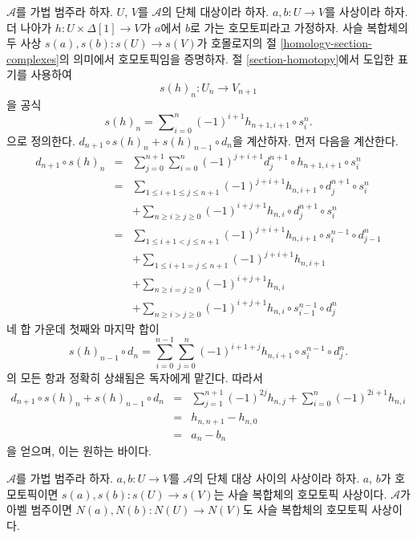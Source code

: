 \noindent
$\mathcal{A}$를 가법 범주라 하자. $U$, $V$를 $\mathcal{A}$의 단체
대상이라 하자. $a, b : U \to V$를 사상이라 하자. 더 나아가
$h : U \times \Delta[1] \to V$가 $a$에서 $b$로 가는 호모토피라고
가정하자. 사슬 복합체의 두 사상
$s(a), s(b) : s(U) \longrightarrow s(V)$가 호몰로지의 절
\ref{homology-section-complexes}의 의미에서 호모토픽임을 증명하자.
절 \ref{section-homotopy}에서 도입한 표기를 사용하여
$$
s(h)_n : U_n \longrightarrow V_{n + 1}
$$
을 공식
\begin{equation}
\label{equation-homotopy-to-homotopy}
s(h)_n = \sum\nolimits_{i = 0}^n (-1)^{i + 1} h_{n + 1, i + 1} \circ s^n_i.
\end{equation}
으로 정의한다.
$d_{n + 1} \circ s(h)_n + s(h)_{n - 1} \circ d_n$을 계산하자.
먼저 다음을 계산한다.
\begin{eqnarray*}
d_{n + 1} \circ s(h)_n & = &
\sum\nolimits_{j = 0}^{n + 1}
\sum\nolimits_{i = 0}^n
(-1)^{j + i + 1}
d^{n + 1}_j \circ h_{n + 1, i + 1} \circ s^n_i \\
& = &
\sum\nolimits_{1 \leq i + 1 \leq j \leq n + 1}
(-1)^{j + i + 1}
h_{n, i + 1} \circ d^{n + 1}_j \circ s^n_i \\
& &
+
\sum\nolimits_{n \geq i \geq j \geq 0}
(-1)^{i + j + 1}
h_{n, i} \circ d^{n + 1}_j \circ s^n_i \\
& = &
\sum\nolimits_{1 \leq i + 1 < j \leq n + 1}
(-1)^{j + i + 1}
h_{n, i + 1} \circ s^{n - 1}_i \circ d^n_{j - 1} \\
& &
+
\sum\nolimits_{1 \leq i + 1 = j \leq n + 1}
(-1)^{j + i + 1}
h_{n, i + 1} \\
& &
+
\sum\nolimits_{n \geq i = j \geq 0}
(-1)^{i + j + 1}
h_{n, i} \\
& &
+
\sum\nolimits_{n \geq i > j \geq 0}
(-1)^{i + j + 1}
h_{n, i} \circ s^{n - 1}_{i - 1} \circ d^n_j
\end{eqnarray*}
네 합 가운데 첫째와 마지막 합이
$$
s(h)_{n - 1} \circ d_n
=
\sum_{i = 0}^{n - 1} \sum_{j = 0}^n
(-1)^{i + 1 + j} h_{n, i + 1} \circ s^{n - 1}_i \circ d^n_j.
$$
의 모든 항과 정확히 상쇄됨은 독자에게 맡긴다. 따라서
\begin{eqnarray*}
d_{n + 1} \circ s(h)_n + s(h)_{n - 1} \circ d_n
& = &
\sum_{j = 1}^{n + 1} (-1)^{2j} h_{n, j}
+
\sum_{i = 0}^n (-1)^{2i + 1} h_{n, i} \\
& = &
h_{n, n + 1} - h_{n , 0} \\
& = &
a_n - b_n
\end{eqnarray*}
을 얻으며, 이는 원하는 바이다.

\begin{lemma}
\label{lemma-homotopy-s-N}
$\mathcal{A}$를 가법 범주라 하자. $a, b : U \to V$를
$\mathcal{A}$의 단체 대상 사이의 사상이라 하자. $a$, $b$가 호모토픽이면
$s(a), s(b) : s(U) \to s(V)$는 사슬 복합체의 호모토픽 사상이다.
$\mathcal{A}$가 아벨 범주이면
$N(a), N(b) : N(U) \to N(V)$도 사슬 복합체의 호모토픽 사상이다.
\end{lemma}

